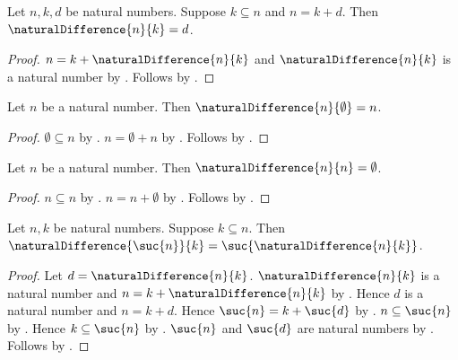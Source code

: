 \begin{proposition}\label{natural_difference_eq}
    Let $n,k,d$ be natural numbers.
    Suppose $k\subseteq n$ and $n=k+d$.
    Then $\naturalDifference{n}{k}=d$.
\end{proposition}
\begin{proof}
    $n=k+\naturalDifference{n}{k}$ and
        $\naturalDifference{n}{k}$ is a natural number by
        .
    Follows by .
\end{proof}

\begin{proposition}\label{natural_difference_zero}
    Let $n$ be a natural number.
    Then $\naturalDifference{n}{\emptyset}=n$.
\end{proposition}
\begin{proof}
    $\emptyset\subseteq n$ by .
    $n=\emptyset+n$ by .
    Follows by .
\end{proof}

\begin{proposition}\label{natural_difference_self}
    Let $n$ be a natural number.
    Then $\naturalDifference{n}{n}=\emptyset$.
\end{proposition}
\begin{proof}
    $n\subseteq n$ by .
    $n=n+\emptyset$ by .
    Follows by .
\end{proof}

\begin{proposition}\label{natural_difference_successor_left}
    Let $n,k$ be natural numbers.
    Suppose $k\subseteq n$.
    Then
        $\naturalDifference{\suc{n}}{k}
            =\suc{\naturalDifference{n}{k}}$.
\end{proposition}
\begin{proof}
    Let $d=\naturalDifference{n}{k}$.
    $\naturalDifference{n}{k}$ is a natural number and
        $n=k+\naturalDifference{n}{k}$ by
        .
    Hence $d$ is a natural number and $n=k+d$.
    Hence $\suc{n}=k+\suc{d}$ by
        .
    $n\subseteq\suc{n}$ by .
    Hence $k\subseteq\suc{n}$ by .
    $\suc{n}$ and $\suc{d}$ are natural numbers by
        .
    Follows by .
\end{proof}

